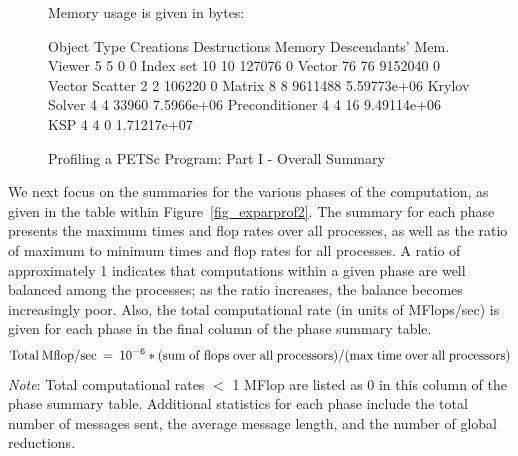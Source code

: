 \begin{figure}[tb]
\begin{outputlisting}[\tiny\ttfamily]
Memory usage is given in bytes:

Object Type      Creations   Destructions   Memory  Descendants' Mem.
Viewer                5              5          0     0
Index set            10             10     127076     0
Vector               76             76    9152040     0
Vector Scatter        2              2     106220     0
Matrix                8              8    9611488     5.59773e+06
Krylov Solver         4              4      33960     7.5966e+06
Preconditioner        4              4         16     9.49114e+06
KSP                   4              4          0     1.71217e+07
\end{outputlisting}
\caption{Profiling a PETSc Program: Part I - Overall Summary}
\label{fig_exparprof}
\end{figure}

We next focus on the summaries for the various phases of the
computation, as given in the table within Figure~\ref{fig_exparprof2}.  The summary for
each phase presents the maximum times and flop rates over all
processes, as well as the ratio of maximum to minimum times and flop
rates for all processes.  A ratio of approximately 1 indicates that
computations within a given phase are well balanced among the
processes; as the ratio increases, the balance becomes increasingly
poor.  Also, the total computational rate (in units of MFlops/sec) is
given for each phase in the final column of the phase summary table.
\[
   {\rm Total\: Mflop/sec} \:=\: 10^{-6} * ({\rm sum\; of\; flops\; over\; all\; processors})/({\rm max\; time\; over\; all\; processors})
\]
{\em Note}: Total computational rates $<$ 1 MFlop are listed as 0 in this column
of the phase summary table.
Additional statistics for each phase include the total number of messages sent,
the average message length, and the number of global reductions.


